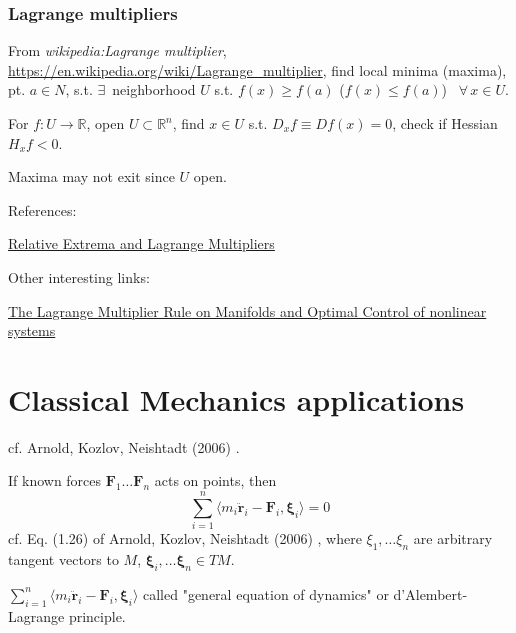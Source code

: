 \documentclass[10pt]{amsart}
\begin{document}
\begin{multicols*}{2}
\section{Lagrange multipliers}

From \emph{wikipedia:Lagrange multiplier}, \url{https://en.wikipedia.org/wiki/Lagrange_multiplier},
find local minima (maxima), pt. $a\in N$, s.t. $\exists \, $ neighborhood $U$ s.t. $f(x) \geq f(a)$ ($f(x) \leq f(a)$) \, $\forall \, x\in U$.

For $f:U\to \mathbb{R}$, open $U\subset \mathbb{R}^n$, find $x\in U$ s.t. $D_xf \equiv Df(x) =0$, check if Hessian $H_x f<0$.

Maxima may not exit since $U$ open.


References:

\href{http://www.math.uni.wroc.pl/~karch/analiza_nieliniowa/18_mnozniki-lagrangea.pdf}{Relative Extrema and Lagrange Multipliers}

Other interesting links:

\href{http://oai.cwi.nl/oai/asset/2552/2552A.pdf}{The Lagrange Multiplier Rule on Manifolds and Optimal Control of nonlinear systems}


\part{Classical Mechanics applications}

cf. Arnold, Kozlov, Neishtadt (2006) \cite{AKN2006}. 

If known forces $\mathbf{F}_1 \dots \mathbf{F}_n$ acts on points, then 
\begin{equation}
\sum_{i=1}^n \langle m_i \ddot{ \mathbf{r}}_i - \mathbf{F}_i , \mathbf{\xi}_i \rangle = 0
\end{equation}
cf. Eq. (1.26) of Arnold, Kozlov, Neishtadt (2006) \cite{AKN2006}, where $\xi_1 , \dots \xi_n$ are arbitrary tangent vectors to $M$, $\mathbf{\xi}_i, \dots \mathbf{\xi}_n \in TM$.  

$\sum_{i=1}^n \langle m_i \ddot{ \mathbf{r}}_i - \mathbf{F}_i , \mathbf{\xi}_i \rangle$ called "general equation of dynamics" or d'Alembert-Lagrange principle.  







\end{multicols*}
\end{document}
